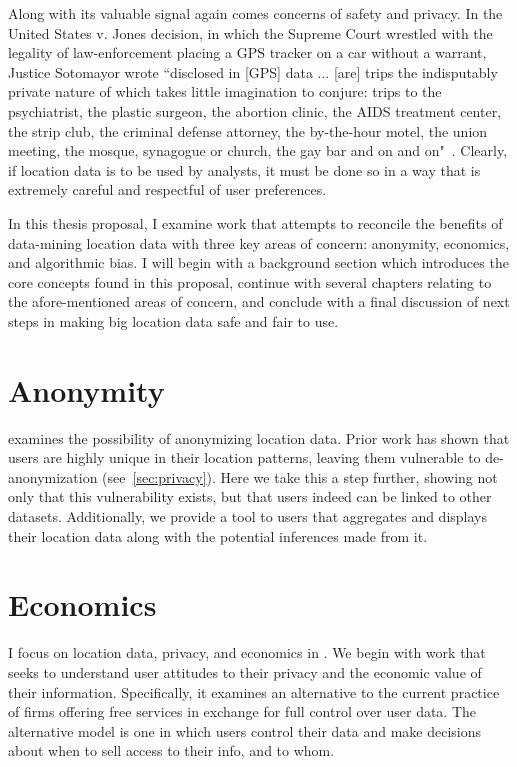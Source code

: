 Along with its valuable signal again comes concerns of safety and privacy.
In the United States v. Jones decision, in which the Supreme Court wrestled with the legality of law-enforcement placing a GPS tracker on a car without a warrant, Justice Sotomayor wrote 
``disclosed in [GPS] data ... [are] trips the indisputably private nature of which takes little imagination to conjure: trips to the psychiatrist, the plastic surgeon, the abortion clinic, the AIDS treatment center, the strip club, the criminal defense attorney, the by-the-hour motel, the union meeting, the mosque, synagogue or church, the gay bar and on and on"~\cite{jones2012us}.
Clearly, if location data is to be used by analysts, it must be done so in a way that is extremely careful and respectful of user preferences.

In this thesis proposal, I examine work that attempts to reconcile the benefits of data-mining location data with three key areas of concern: anonymity, economics, and algorithmic bias.
I will begin with a background section which introduces the core concepts found in this proposal, continue with several chapters relating to the afore-mentioned areas of concern, and conclude with a final discussion of next steps in making big location data safe and fair to use.

\section{Anonymity}
 examines the possibility of anonymizing location data. %
Prior work has shown that users are highly unique in their location patterns, leaving them vulnerable to de-anonymization (see~\ref{sec:privacy}).
Here we take this a step further, showing not only that this vulnerability exists, but that users indeed can be linked to other datasets.
Additionally, we provide a tool to users that aggregates and displays their location data along with the potential inferences made from it.

\section{Economics}
I focus on location data, privacy, and economics in .
We begin with work that seeks to understand user attitudes to their privacy and the economic value of their information.
Specifically, it examines an alternative to the current practice of firms offering free services in exchange for full control over user data.
The alternative model is one in which users control their data and make decisions about when to sell access to their info, and to whom.


